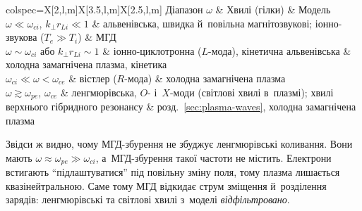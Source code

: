 \begin{table}[ht]
	\centering\small
	\caption{Які хвилі відповідають якому діапазону частот у~замагніченій плазмі.}
	\label{tab:wave-map}
	\begin{platbl}{colspec={X[2,l,m]X[3.5,l,m]X[2.5,l,m]}}
Діапазон $\omega$ & Хвилі (гілки) & Модель \\

$\omega\ll\omega_{ci}$, $k_\perp r_{Li}\ll1$ &
альвенівська, швидка й~повільна магнітозвукові; іонно-звукова ($T_e\gg T_i$) &
МГД \\

$\omega\sim\omega_{ci}$ або $k_\perp r_{Li}\sim1$ &
іонно-циклотронна ($L$-мода), кінетична альвенівська &
холодна замагнічена плазма, кінетика \\

$\omega_{ci}\ll\omega<\omega_{ce}$ &
вістлер ($R$-мода) &
холодна замагнічена плазма \\

$\omega\gtrsim\omega_{pe}$, $\omega_{ce}$ &
ленгмюрівська, $O$- і~$X$-моди (світлові хвилі в~плазмі); хвилі верхнього гібридного резонансу &
розд.~\ref{sec:plasma-waves}, холодна замагнічена плазма \\
	\end{platbl}
\end{table}

Звідси ж видно, чому МГД-збурення не збуджує ленгмюрівські коливання. Вони мають $\omega\approx\omega_{pe}\gg\omega_{ci}$,
а~МГД-збурення такої частоти не містить. Електрони встигають \enquote{підлаштуватися} під повільну зміну поля, тому плазма лишається квазінейтральною.
Саме тому МГД відкидає струм зміщення й~розділення зарядів: ленгмюрівські та світлові хвилі з~моделі \emph{відфільтровано}.

